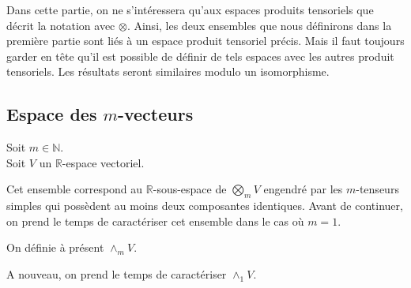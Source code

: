 \documentclass[../geometrie.tex]{subfiles}
\begin{document}
	Dans cette partie, on ne s'intéressera qu'aux espaces produits tensoriels que décrit la notation avec $\otimes$. Ainsi, les deux ensembles que nous définirons dans la première partie sont liés à un espace produit tensoriel précis. Mais il faut toujours garder en tête qu'il est possible de définir de tels espaces avec les autres produit tensoriels. Les résultats seront similaires modulo un isomorphisme.

	\subsection{Espace des \texorpdfstring{$m$-vecteurs}{m-vecteurs}}{
		\noindent Soit $m \in \mathbb{N}$. \\
		\noindent Soit $V$ un $\mathbb{R}$-espace vectoriel.


		Cet ensemble correspond au $\mathbb{R}$-sous-espace de $\bigotimes_{m} V$ engendré par les $m$-tenseurs simples qui possèdent au moins deux composantes identiques. Avant de continuer, on prend le temps de caractériser cet ensemble dans le cas où $m = 1$.



		On définie à présent $\wedge_{m} V$.


		A nouveau, on prend le temps de caractériser $\wedge_{1} V$.

}
\end{document}
